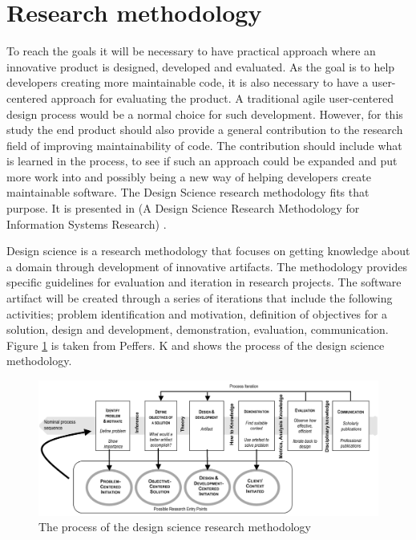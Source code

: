 \documentclass{report}
\begin{document}
\section{Research methodology}
To reach the goals it will be necessary to have practical approach where an innovative product is designed, developed and evaluated. As the goal is to help developers creating more maintainable code, it is also necessary to have a user-centered approach for evaluating the product. A traditional agile user-centered design process would be a normal choice for such development. However, for this study the end product should also provide a general contribution to the research field of improving maintainability of code. The contribution should include what is learned in the process, to see if such an approach could be expanded and put more work into and possibly being a new way of helping developers create maintainable software. The Design Science research methodology fits that purpose. It is presented in (A Design Science Research Methodology for Information Systems Research) \cite{10.2753/MIS0742-1222240302}.

Design science is a research methodology that focuses on getting knowledge about a domain through development of innovative artifacts. The methodology provides specific guidelines for evaluation and iteration in research projects. The software artifact will be created through a series of iterations that include the following activities; problem identification and motivation, definition of objectives for a solution, design and development, demonstration, evaluation, communication. Figure \ref{fig:designScience} is taken from Peffers. K \cite{Peffers2007ADS} and shows the process of the design science methodology. 

\begin{figure}[h!]
    \centering
    \includegraphics[width=\textwidth]{report/images/designScience.png}
    \caption{The process of the design science research methodology}
    \label{fig:designScience}
\end{figure}
\end{document}
